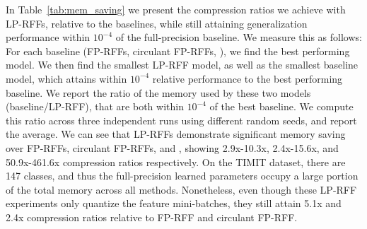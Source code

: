 In Table~\ref{tab:mem_saving} we present the compression ratios we achieve with LP-RFFs, relative to the baselines, while still attaining generalization performance within $10^{-4}$ of the full-precision baseline.  We measure this as follows: For each baseline (FP-RFFs, circulant FP-RFFs, \NystromNS), we find the best performing model. We then find the smallest LP-RFF model, as well as the smallest baseline model, which attains within $10^{-4}$ relative performance to the best performing baseline. We report the ratio of the memory used by these two models (baseline/LP-RFF), that are both within $10^{-4}$ of the best baseline. We compute this ratio across three independent runs using different random seeds, and report the average.  We can see that LP-RFFs demonstrate significant memory saving over FP-RFFs, circulant FP-RFFs, and \NystromNS, showing 2.9x-10.3x, 2.4x-15.6x, and 50.9x-461.6x compression ratios respectively. On the TIMIT dataset, there are 147 classes, and thus the full-precision learned parameters occupy a large portion of the total memory across all methods. Nonetheless, even though these LP-RFF experiments only quantize the feature mini-batches, they still attain 5.1x and 2.4x compression ratios relative to FP-RFF and circulant FP-RFF.

